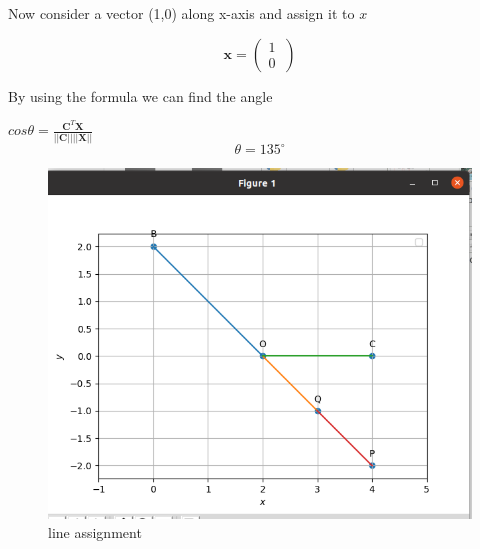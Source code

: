 \documentclass[10pt, a4paper]{article}
\let\vec\mathbf
\begin{document}
  Now consider a vector (1,0) along x-axis and assign it to $x$\\
\begin{center}

	$$\vec{x}=\begin{pmatrix} 1\\ 0\ \end{pmatrix}$$
\end{center}

By using the formula we can find the angle\\
\begin{center}
	$cos\theta=\frac{\vec{C}^{T}\vec{X}}{||\vec{C}|| ||\vec{X}||}$\\
 $$\theta=135^{\circ}$$
 \end{center}
\begin{figure}[h!]
  \includegraphics[scale=0.5]{fig.png}
  \caption{line assignment }
  \label{fig:line assignment}
\end{figure}
\end{document}
